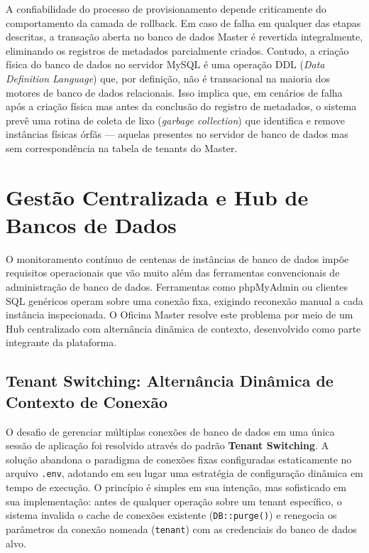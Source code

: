 A confiabilidade do processo de provisionamento depende criticamente do
comportamento da camada de rollback. Em caso de falha em qualquer das etapas
descritas, a transação aberta no banco de dados Master é revertida
integralmente, eliminando os registros de metadados parcialmente criados.
Contudo, a criação física do banco de dados no servidor MySQL é uma operação
DDL (\textit{Data Definition Language}) que, por definição, não é transacional
na maioria dos motores de banco de dados relacionais. Isso implica que, em
cenários de falha após a criação física mas antes da conclusão do registro de
metadados, o sistema prevê uma rotina de coleta de lixo (\textit{garbage
collection}) que identifica e remove instâncias físicas órfãs --- aquelas
presentes no servidor de banco de dados mas sem correspondência na tabela de
tenants do Master.


\section{Gestão Centralizada e Hub de Bancos de Dados}

O monitoramento contínuo de centenas de instâncias de banco de dados impõe
requisitos operacionais que vão muito além das ferramentas convencionais de
administração de banco de dados. Ferramentas como phpMyAdmin ou clientes SQL
genéricos operam sobre uma conexão fixa, exigindo reconexão manual a cada
instância inspecionada. O Oficina Master resolve este problema por meio de
um Hub centralizado com alternância dinâmica de contexto, desenvolvido como
parte integrante da plataforma.

\subsection{Tenant Switching: Alternância Dinâmica de Contexto de Conexão}

O desafio de gerenciar múltiplas conexões de banco de dados em uma única sessão
de aplicação foi resolvido através do padrão \textbf{Tenant Switching}. A
solução abandona o paradigma de conexões fixas configuradas estaticamente no
arquivo \texttt{.env}, adotando em seu lugar uma estratégia de configuração
dinâmica em tempo de execução. O princípio é simples em sua intenção, mas
sofisticado em sua implementação: antes de qualquer operação sobre um tenant
específico, o sistema invalida o cache de conexões existente (\texttt{DB::purge()})
e renegocia os parâmetros da conexão nomeada (\texttt{tenant}) com as
credenciais do banco de dados alvo.

